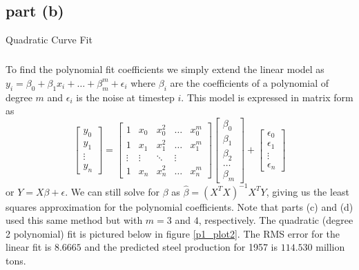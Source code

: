 \documentclass[11pt]{article}
\begin{document}
\subsection*{part (b)}
Quadratic Curve Fit

\subparagraph*{}
To find the polynomial fit coefficients we simply extend the linear model as $y_i = \beta_0 + \beta_1x_i + \dots + \beta_m^m + \epsilon_i$ where $\beta_i$ are the coefficients of a polynomial of degree $m$ and $\epsilon_i$ is the noise at timestep $i$. This model is expressed in matrix form as 
\begin{equation*}
	\begin{bmatrix} y_0 \\ y_1 \\ \vdots \\ y_n \end{bmatrix} = \begin{bmatrix} 1 & x_0 & x_0^2 & \dots & x_0^m \\ 1 & x_1 & x_1^2 & \dots & x_1^m \\ \vdots & \vdots & \ddots & \vdots \\ 1 & x_n & x_n^2 & \dots & x_n^m \end{bmatrix} \begin{bmatrix} \beta_0 \\ \beta_1 \\ \beta_2 \\ \dots \\ \beta_m \end{bmatrix} + \begin{bmatrix} \epsilon_0 \\ \epsilon_1 \\ \vdots \\ \epsilon_n \end{bmatrix}
\end{equation*}
or $Y=X\beta + \epsilon$. We can still solve for $\beta$ as $\hat{\beta}=(X^TX)^{-1}X^TY$, giving us the least squares approximation for the polynomial coefficients. Note that parts (c) and (d) used this same method but with $m=3$ and $4$, respectively. 
The quadratic (degree 2 polynomial) fit is pictured below in figure \ref{p1_plot2}. The RMS error for the linear fit is $8.6665$ and the predicted steel production for 1957 is $114.530$ million tons. 
\end{document}
